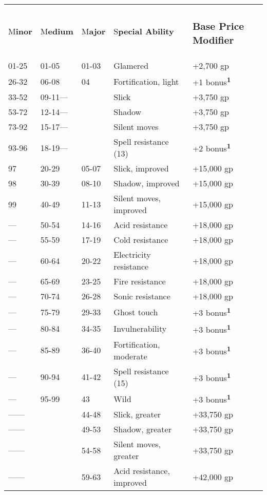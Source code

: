 \documentclass{article}
\begin{document}
\vspace{12pt}
\begin{tabular}{|>{\raggedright}p{23pt}|>{\raggedright}p{28pt}|>{\raggedright}p{21pt}|>{\raggedright}p{124pt}|>{\raggedright}p{92pt}|}
\hline
\multicolumn{5}{|p{290pt}|}{\section*{T\textbf{able: Armor Special Abilities}}}\tabularnewline
\hline
M\textbf{inor} & M\textbf{edium} & M\textbf{ajor} & S\textbf{pecial Ability} & \subsubsection*{B\textbf{ase 
Price Modifier}}\tabularnewline
\hline
01-25 & 01-05 & 01-03 & Glamered & +2,700 gp\tabularnewline
\hline
26-32 & 06-08 & 04 & Fortification, light & +1 bonus\textsuperscript{\textbf{1}}\tabularnewline
\hline
33-52 & 09-11--- &  & Slick & +3,750 gp\tabularnewline
\hline
53-72 & 12-14--- &  & Shadow & +3,750 gp\tabularnewline
\hline
73-92 & 15-17--- &  & Silent moves & +3,750 gp\tabularnewline
\hline
93-96 & 18-19--- &  & Spell resistance (13) & +2 bonus\textsuperscript{\textbf{1}}\tabularnewline
\hline
97 & 20-29 & 05-07 & Slick, improved & +15,000 gp\tabularnewline
\hline
98 & 30-39 & 08-10 & Shadow, improved & +15,000 gp\tabularnewline
\hline
99 & 40-49 & 11-13 & Silent moves, improved & +15,000 gp\tabularnewline
\hline
--- & 50-54 & 14-16 & Acid resistance & +18,000 gp\tabularnewline
\hline
--- & 55-59 & 17-19 & Cold resistance & +18,000 gp\tabularnewline
\hline
--- & 60-64 & 20-22 & Electricity resistance & +18,000 gp\tabularnewline
\hline
--- & 65-69 & 23-25 & Fire resistance & +18,000 gp\tabularnewline
\hline
--- & 70-74 & 26-28 & Sonic resistance & +18,000 gp\tabularnewline
\hline
--- & 75-79 & 29-33 & Ghost touch & +3 bonus\textsuperscript{\textbf{1}}\tabularnewline
\hline
--- & 80-84 & 34-35 & Invulnerability & +3 bonus\textsuperscript{\textbf{1}}\tabularnewline
\hline
--- & 85-89 & 36-40 & Fortification, moderate & +3 bonus\textsuperscript{\textbf{1}}\tabularnewline
\hline
--- & 90-94 & 41-42 & Spell resistance (15) & +3 bonus\textsuperscript{\textbf{1}}\tabularnewline
\hline
--- & 95-99 & 43 & Wild & +3 bonus\textsuperscript{\textbf{1}}\tabularnewline
\hline
------ &  & 44-48 & Slick, greater & +33,750 gp\tabularnewline
\hline
------ &  & 49-53 & Shadow, greater & +33,750 gp\tabularnewline
\hline
------ &  & 54-58 & Silent moves, greater & +33,750 gp\tabularnewline
\hline
------ &  & 59-63 & Acid resistance, improved & +42,000 gp\tabularnewline

\end{tabular}
\end{document}
